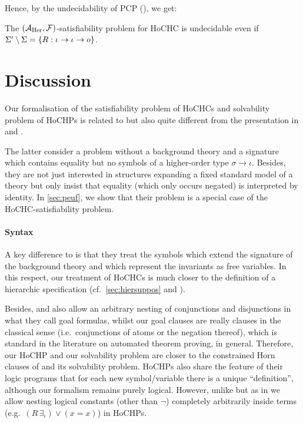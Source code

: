 \documentclass[a4paper,twoside,notitlepage,openright,11pt]{report}
\begin{document}
Hence, by the undecidability of PCP (\cite{P46}), we get:
\begin{theorem}
  The $(\mathcal A_{\operatorname{Her}},\mathcal F)$-satisfiability problem for HoCHC is undecidable even if $\Sigma'\setminus\Sigma=\{R:\iota\to\iota\to o\}$.
\end{theorem}

\section{Discussion}
\label{sec:discussion}

Our formalisation of the satisfiability problem of HoCHCs and solvability problem of HoCHPs is related to but also quite different from the presentation in \cite{BOR18} and \cite{CHRW13}.

The latter consider a problem without a background theory and a signature which contains equality but no symbols of a higher-order type $\sigma\to\iota$. Besides, they are not just interested in structures expanding a fixed standard model of a theory but only insist that equality (which only occurs negated) is interpreted by identity.
In \cref{sec:peuf}, we show that their problem is a special case of the HoCHC-satisfiability problem.

\paragraph{Syntax}A key difference to \cite{BOR18} is that they treat the symbols which extend the signature of the background theory and which represent the invariants as free variables. %
In this respect, our treatment of HoCHCs is much closer to the definition of a hierarchic specification (cf.\ \cref{sec:hiersuppos} and \cite{BGW94,AKW09}).

Besides, \cite{BOR18} and also \cite{CHRW13} allow an arbitrary nesting of conjunctions and disjunctions in what they call goal formulas, whilst our goal clauses are really clauses in the classical sense (i.e.\ conjunctions of atoms or the negation thereof), which is standard in the literature on automated theorem proving, in general.
Therefore, our HoCHP and our solvability problem are closer to the constrained Horn clauses of \cite{BOR18} and its solvability problem. HoCHPs also share the feature of their logic programs that for each new symbol/variable there is a unique ``definition'', although our formalism remains purely logical. However, unlike \cite{BOR18} but as in \cite{CHRW13} we allow nesting logical constants (other than $\neg$) completely arbitrarily inside terms (e.g.\ $(R\,\exists_\iota)\lor (x=x)$) in HoCHPs.
\end{document}
